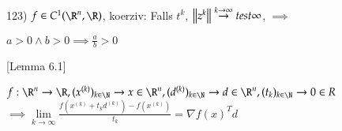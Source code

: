 \documentclass[12pt]{article}   %
\begin{document}
123)
$f \in C^1(\R^n, \R)$, koerziv: Falls ${t^k}$, $\left\lVert z^k\right\rVert \overset{k\to\infty}{\to}{test} \infty $, \newline
$\implies$
\blindtext

$a > 0 \land b > 0 \implies \frac ab > 0$

[Lemma 6.1]

$f:\R^n\to\R, (x^{(k)})_{k\in\N} \to x \in \R^n, (d^{(k)})_{k\in\N} \to d \in \R^n, (t_k)_{k\in\N} \to 0 \in R$ \\
$\implies \underset{k\to\infty}{\lim} \frac{f(x^{(k)}+t_kd^{(k)}) - f(x^{(k)})}{t_k} = \nabla {f(x)}^Td$
\end{document}

